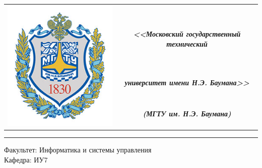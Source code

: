 \begin{table}[H]
    \centering
    \begin{tabular}{cc}
        \multirow{4}{*}{\includegraphics[scale=0.3]{img/titlepage/bmstu.jpg}}
        & \\
        & \large \textit{\textbf{<<Московский государственный технический}} \\
        & \large \textit{\textbf{университет имени Н.Э. Баумана>>}}\\
        & \large \textit{\textbf{(МГТУ им. Н.Э. Баумана)}}\\
    \end{tabular}
\end{table}

\begin{flushleft}
    \rule{\textwidth}{3pt}
\end{flushleft}

\begin{flushleft}
    \Large
    Факультет: Информатика и системы управления \\
    Кафедра: ИУ7
\end{flushleft}

\vspace{2cm}
